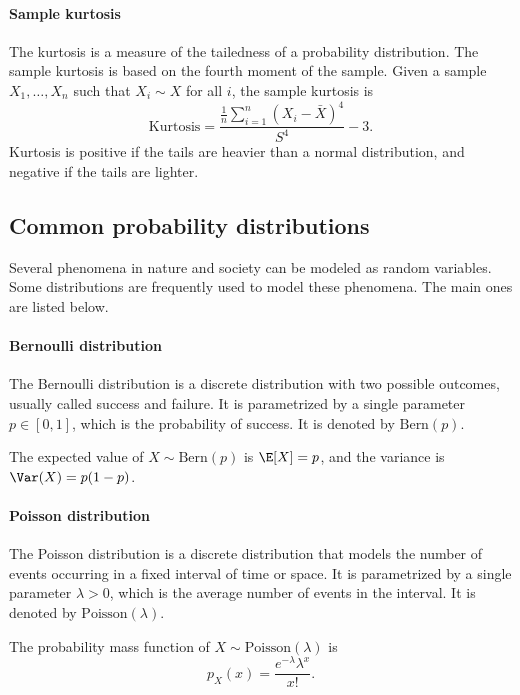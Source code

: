 \paragraph{Sample kurtosis}  The kurtosis is a measure of the tailedness of a probability
distribution.  The sample kurtosis is based on the fourth moment of the sample.  Given a
sample $X_1, \dots, X_n$ such that $X_i \sim X$ for all $i$, the sample kurtosis is
\begin{equation*}
  \text{Kurtosis} = \frac{\frac{1}{n} \sum_{i = 1}^n (X_i - \bar{X})^4}{S^4} - 3\text{.}
\end{equation*}
Kurtosis is positive if the tails are heavier than a normal distribution, and negative if
the tails are lighter.

\subsection{Common probability distributions}

Several phenomena in nature and society can be modeled as random variables.  Some
distributions are frequently used to model these phenomena.  The main ones are
listed below.

\paragraph{Bernoulli distribution}  The Bernoulli distribution is a discrete
distribution with two possible outcomes, usually called success and failure.  It is
parametrized by a single parameter $p \in [0, 1]$, which is the probability of
success.  It is denoted by $\text{Bern}(p)$.

The expected value of $X \sim \text{Bern}(p)$ is $\E[X] = p$, and the variance is
$\Var(X) = p(1 - p)$.

\paragraph{Poisson distribution}  The Poisson distribution is a discrete distribution
that models the number of events occurring in a fixed interval of time or space.  It is
parametrized by a single parameter $\lambda > 0$, which is the average number of events
in the interval.  It is denoted by $\text{Poisson}(\lambda)$.

The probability mass function of $X \sim \text{Poisson}(\lambda)$ is
\begin{equation}
  \label{eq:poisson}
  p_X(x) = \frac{e^{-\lambda} \lambda^x}{x!}\text{.}
\end{equation}

